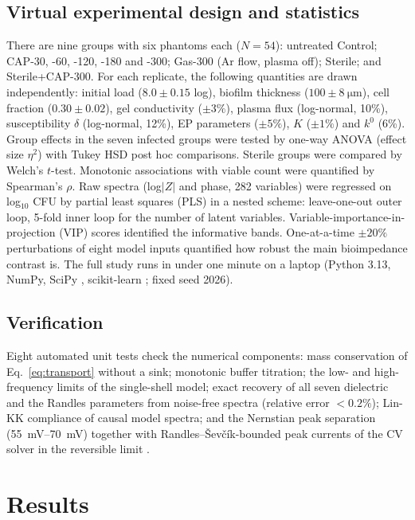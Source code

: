 \documentclass[pdflatex,sn-mathphys-num]{sn-jnl}%
\begin{document}
\subsection{Virtual experimental design and statistics}

There are nine groups with six phantoms each ($N=54$): untreated Control; CAP-30, -60, -120, -180 and -300; Gas-300 (Ar flow, plasma off); Sterile; and Sterile+CAP-300. For each replicate, the following quantities are drawn independently: initial load ($8.0\pm0.15$ log), biofilm thickness ($100\pm\SI{8}{\micro\metre}$), cell fraction ($0.30\pm0.02$), gel conductivity ($\pm3\%$), plasma flux (log-normal, 10\%), susceptibility $\delta$ (log-normal, 12\%), EP parameters ($\pm5\%$), $K$ ($\pm1\%$) and $k^0$ (6\%). Group effects in the seven infected groups were tested by one-way ANOVA (effect size $\eta^2$) with Tukey HSD post hoc comparisons. Sterile groups were compared by Welch's $t$-test. Monotonic associations with viable count were quantified by Spearman's $\rho$. Raw spectra (log$|Z|$ and phase, 282 variables) were regressed on log$_{10}$ CFU by partial least squares (PLS) \cite{wold2001} in a nested scheme: leave-one-out outer loop, 5-fold inner loop for the number of latent variables. Variable-importance-in-projection (VIP) scores identified the informative bands. One-at-a-time $\pm20\%$ perturbations of eight model inputs quantified how robust the main bioimpedance contrast is. The full study runs in under one minute on a laptop (Python 3.13, NumPy, SciPy \cite{virtanen2020}, scikit-learn \cite{pedregosa2011}; fixed seed 2026).

\subsection{Verification}\label{sec:verification}

Eight automated unit tests check the numerical components: mass conservation of Eq.~\eqref{eq:transport} without a sink; monotonic buffer titration; the low- and high-frequency limits of the single-shell model; exact recovery of all seven dielectric and the Randles parameters from noise-free spectra (relative error $<0.2\%$); Lin-KK compliance of causal model spectra; and the Nernstian peak separation (\SIrange{55}{70}{\milli\volt}) together with Randles--\v{S}ev\v{c}\'ik-bounded peak currents of the CV solver in the reversible limit \cite{bard2001}.

\section{Results}\label{sec:results}
\end{document}
